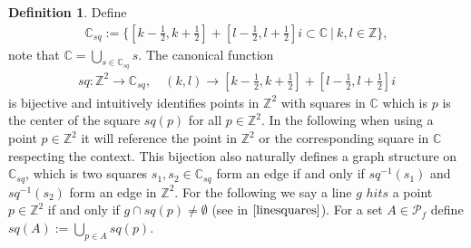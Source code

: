 \documentclass[12pt,a4paper]{scrartcl}
\numberwithin{equation}{subsection}
\newcommand{\C}{\mathbb{C}} %
\newcommand{\1}{\mathbbm{1}}
\newcommand{\mP}{\mathcal{P}}
\numberwithin{equation}{section}
\theoremstyle{definition}
\newtheorem{definition}{Definition}[subsection]
\begin{document}
\begin{definition} \label{squares}
	Define 
	\begin{align}
		\C_{sq} := \{[k - \frac{1}{2}, k + \frac{1}{2}] + [l- \frac{1}{2}, l + \frac{1}{2}]i \subset \C\ |\ k,l \in \mathbb{Z}\}, 
	\end{align} 
	note that $\C = \bigcup_{s\in \C_{sq}} s$. The canonical function
	\begin{align}
	sq: \mathbb{Z}^2 \to \C_{sq},\quad (k,l)\to [k - \frac{1}{2}, k + \frac{1}{2}] + [l- \frac{1}{2}, l + \frac{1}{2}]i
	\end{align}
	is bijective and intuitively identifies points in $\mathbb{Z}^2$ with squares in $\C$ which is $p$ is the center of the square $sq(p)$ for all $p\in \mathbb{Z}^2$. In the following when using a point $p\in \mathbb{Z}^2$ it will reference the point in $\mathbb{Z}^2$ or the corresponding square in $\C$ respecting the context. This bijection also naturally defines a graph structure on $\C_{sq}$, which is two squares $s_1, s_2\in \C_{sq}$ form an edge if and only if $sq^{-1}(s_1)$ and $sq^{-1}(s_2)$ form an edge in $\mathbb{Z}^2$. 
	\noindent For the following we say a line $g$ $hits$ a point $p\in \mathbb{Z}^2$ if and only if $g\cap sq(p) \neq \emptyset$ (see in $\autoref{linesquares}$). For a set $A\in\mP_f$ define $sq(A) := \bigcup_{p\in A} sq(p)$. 
	
\end{definition}
\end{document}
